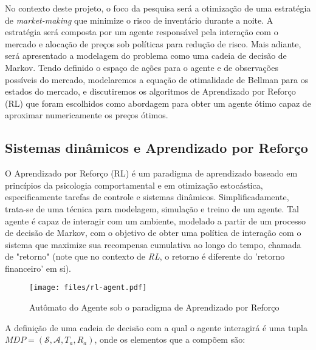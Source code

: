 No contexto deste projeto, o foco da pesquisa será a otimização de uma estratégia de \textit{market-making} que minimize o risco de inventário durante a noite. A estratégia será composta por um agente responsável pela interação com o mercado e alocação de preços sob políticas para redução de risco. Mais adiante, será apresentado a modelagem do problema como uma cadeia de decisão de Markov. Tendo definido o espaço de ações para o agente e de observações possíveis do mercado, modelaremos a equação de otimalidade de Bellman para os estados do mercado, e discutiremos os algoritmos de Aprendizado por Reforço (RL) que foram escolhidos como abordagem para obter um agente ótimo capaz de aproximar numericamente os preços ótimos.

\subsection{Sistemas dinâmicos e Aprendizado por Reforço}
O Aprendizado por Reforço (RL) é um paradigma de aprendizado baseado em princípios da psicologia comportamental e em otimização estocástica, especificamente tarefas de controle e sistemas dinâmicos. Simplificadamente, trata-se de uma técnica para modelagem, simulação e treino de um agente. Tal agente é capaz de interagir com um ambiente, modelado a partir de um processo de decisão de Markov, com o objetivo de obter uma política de interação com o sistema que maximize sua recompensa cumulativa ao longo do tempo, chamada de "retorno" (note que no contexto de \textit{RL}, o retorno é diferente do 'retorno financeiro' em si).

\begin{figure}[H]
	\centering
	\texttt{[image: files/rl-agent.pdf]}
	\caption{Autômato do Agente sob o paradigma de Aprendizado por Reforço}
	\label{fig:rl-agent}
\end{figure}

A definição de uma cadeia de decisão com a qual o agente interagirá é uma tupla $MDP = (\mathcal{S}, \mathcal{A}, T_{a}, R_{a})$, onde os elementos que a compõem são:

